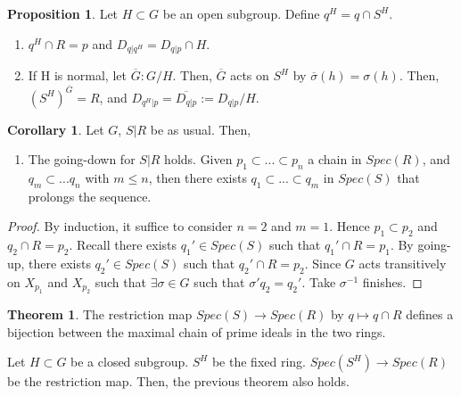 \documentclass{article}
\theoremstyle{definition}
\newtheorem{theorem}{Theorem}[section]
\theoremstyle{definition}
\theoremstyle{definition}
\newtheorem{proposition}{Proposition}[section]
\theoremstyle{definition}
\theoremstyle{definition}
\theoremstyle{definition}
\newtheorem{corollary}{Corollary}[theorem]
\theoremstyle{definition}
\begin{document}
\begin{tcolorbox}[colback=blue!5!white,colframe=blue!30!white]
\begin{proposition}
Let $H\subset G$ be an open subgroup. Define $q^H=q\cap S^H$. 

\begin{enumerate}
    \item  $q^H\cap R=p$ and  $D_{q|q^H}=D_{q|p}\cap H$.
    \item If H is normal, let $\overline{G}: G/H$. Then, $\overline{G}$ acts on $S^H$ by $\overline{\sigma}(h)=\sigma(h)$.  Then, $(S^H)^{\overline{G}}=R$, and $D_{q^H|p}=\overline{D_{q|p}}:=D_{q|p}/H$.
\end{enumerate}
\end{proposition}
\end{tcolorbox}



\begin{tcolorbox}[colback=green!5!white,colframe=green!30!white]
\begin{corollary}
Let $G$, $S|R$ be as usual. Then,
\begin{enumerate}
    \item The going-down for $S|R$ holds. Given $p_1\subset ...\subset p_n$ a chain in $Spec(R)$, and $q_m\subset ...q_n$ with $m\leq n$, then there exists $q_1\subset ... \subset q_m$ in $Spec(S)$ that prolongs the sequence. 
\end{enumerate}
\end{corollary}
\end{tcolorbox}
\begin{proof}
    By induction, it suffice to consider $n=2$ and $m=1$. Hence $p_1\subset p_2$ and $q_2\cap R=p_2$. Recall there exists $q_1'\in Spec(S)$ such that $q_1'\cap R=p_1$. By going-up, there exists $q_2'\in Spec(S)$ such that $q_2'\cap R=p_2$. Since $G$ acts transitively  on $X_{p_1}$ and $X_{p_2}$ such that $\exists \sigma\in G$ such that $\sigma'q_2=q_2'$. Take $\sigma ^{-1}$ finishes. 
\end{proof}


\begin{tcolorbox}[colback=red!5!white,colframe=red!30!white]
\begin{theorem}
The restriction map $Spec(S)\to Spec(R)$ by $q\mapsto q\cap R$ defines a bijection between the maximal chain of prime ideals in the two rings. 
\end{theorem}
\end{tcolorbox}

Let $H\subset G$ be a closed subgroup. $S^H$ be the fixed ring. $Spec(S^H)\to Spec(R)$ be the restriction map. Then, the previous theorem also holds. 
\end{document}
